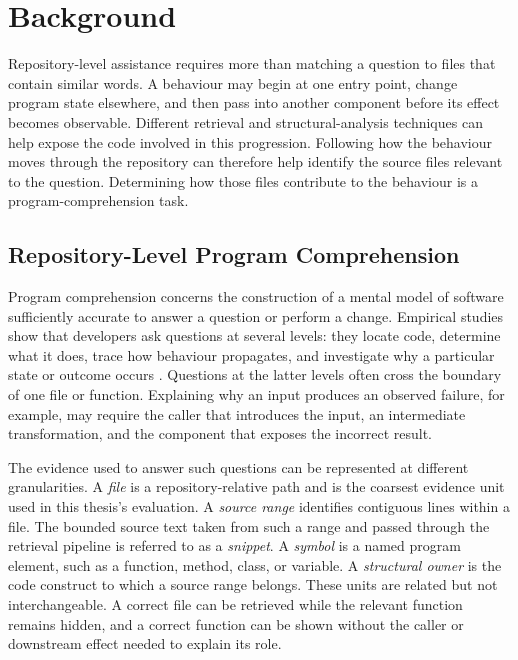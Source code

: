 \chapter{Background}\label{ch:background}

Repository-level assistance requires more than matching a question to files that contain similar words. A behaviour may begin at one entry point, change program state elsewhere, and then pass into another component before its effect becomes observable. Different retrieval and structural-analysis techniques can help expose the code involved in this progression. Following how the behaviour moves through the repository can therefore help identify the source files relevant to the question. Determining how those files contribute to the behaviour is a program-comprehension task.

\section{Repository-Level Program Comprehension}\label{sec:repository-level-program-comprehension}

Program comprehension concerns the construction of a mental model of software sufficiently accurate to answer a question or perform a change. Empirical studies show that developers ask questions at several levels: they locate code, determine what it does, trace how behaviour propagates, and investigate why a particular state or outcome occurs \cite{Ko2007InformationNeeds,Sillito2008ProgrammingQuestions}. Questions at the latter levels often cross the boundary of one file or function. Explaining why an input produces an observed failure, for example, may require the caller that introduces the input, an intermediate transformation, and the component that exposes the incorrect result.

The evidence used to answer such questions can be represented at different granularities. A \emph{file} is a repository-relative path and is the coarsest evidence unit used in this thesis's evaluation. A \emph{source range} identifies contiguous lines within a file. The bounded source text taken from such a range and passed through the retrieval pipeline is referred to as a \emph{snippet}. A \emph{symbol} is a named program element, such as a function, method, class, or variable. A \emph{structural owner} is the code construct to which a source range belongs. These units are related but not interchangeable. A correct file can be retrieved while the relevant function remains hidden, and a correct function can be shown without the caller or downstream effect needed to explain its role.

